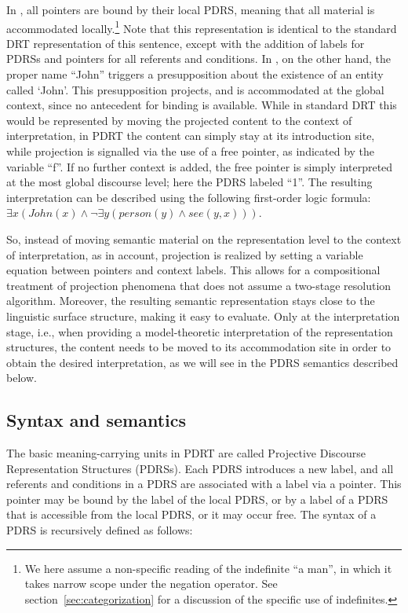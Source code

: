\noindent In \Last[a], all pointers are bound by their local PDRS, meaning
that all material is accommodated locally.\footnote{We here assume
  a non-specific reading of the indefinite ``a man'', in which it takes
  narrow scope under the negation operator. See
section~\ref{sec:categorization} for a discussion of the specific use of
indefinites.} Note that this representation is identical to the standard DRT
representation of this sentence, except with the addition of labels for
PDRSs and pointers for all referents and conditions.
In \Last[b], on the other hand, the proper name ``John'' triggers
a presupposition about the existence of an entity called `John'.  This
presupposition projects, and is accommodated at the global context, since no
antecedent for binding is available.  While in standard DRT this would be
represented by moving the projected content to the context of
interpretation, in PDRT the content can simply stay at its introduction
site, while projection is signalled via the use of a free pointer, as
indicated by the variable ``f''.  If no further context is added, the free
pointer is simply interpreted at the most global discourse level; here the
PDRS labeled ``1''. The resulting interpretation can be described using the
following first-order logic formula:  $\exists x (John(x) \wedge \neg
\exists y (person(y) \wedge see(y,x)))$.

So, instead of moving semantic material on the representation level to the
context of interpretation, as in \cites{sandt1992presupposition} account,
projection is realized by setting a variable equation between pointers and
context labels.  This allows for a compositional treatment of projection
phenomena that does not assume a two-stage resolution algorithm.  Moreover,
the resulting semantic representation stays close to the linguistic
surface structure, making it easy to evaluate.  Only at the interpretation
stage, i.e., when providing a model-theoretic interpretation of the
representation structures, the content needs to be moved to its
accommodation site in order to obtain the desired interpretation, as we will
see in the PDRS semantics described below.

\subsection{Syntax and semantics}

The basic meaning-carrying units in PDRT are called Projective Discourse
Representation Structures (PDRSs). Each PDRS introduces a new label, and all
referents and conditions in a PDRS are associated with a label via
a pointer. This pointer may be bound by the label of the local PDRS, or by
a label of a PDRS that is accessible from the local PDRS, or it may occur
free. The syntax of a PDRS is recursively defined as follows:

